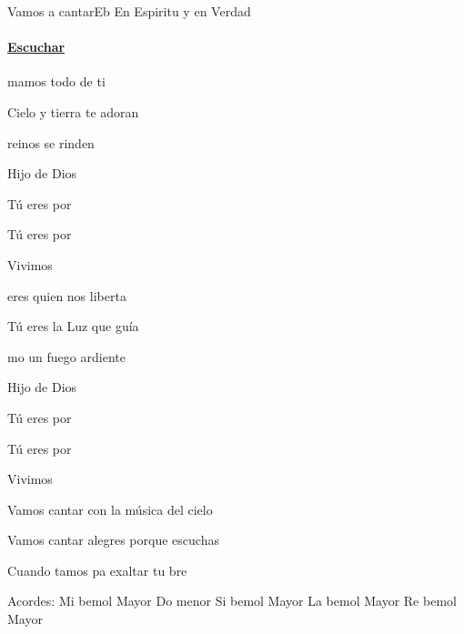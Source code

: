 \documentclass[12pt, spanish]{book}
\newcommand{\NotCCLIed}{\relax}
\begin{document}
    \begin{song}{Vamos a cantar}{Eb}
    {} %
    {En Espiritu y en Verdad}
    {} %
    {} %
        \ifChordBk
        \paragraph{\mbox{}\hfill\protect\href{https://open.spotify.com/intl-es/track/0VuwOyCJLj3T8F8cSyV7Yv}{Escuchar}\mbox{}\hfill}
        \fi

        \begin{SBOpGroup}
            mamos todo de ti

            Cielo y tierra te adoran

             reinos se rinden

            Hijo de Dios

            Tú eres por 

            Tú eres por 

            Vivimos 
        \end{SBOpGroup}

        \begin{SBOpGroup}
             eres quien nos liberta

            Tú eres la Luz que guía

            mo un fuego ardiente

            Hijo de Dios

            Tú eres por 

            Tú eres por 

            Vivimos 
        \end{SBOpGroup}

        \begin{SBChorus}
            Vamos  cantar con la música del cielo

            Vamos  cantar alegres porque escuchas

            Cuando tamos pa exaltar tu bre
        \end{SBChorus}


        \ifChordBk
        \begin{SBOpGroup}
            Acordes:
            \upchord{\Eflat}\qquad Mi bemol Mayor \hfill
            \upchord{\Cm}Do menor \hfill\null\break
            \upchord{\Bflat}\qquad Si bemol Mayor \hfill
            \upchord{\Aflat}\qquad La bemol Mayor \hfill\null\break
            \upchord{\Dflat}\qquad Re bemol Mayor  \hfill
        \end{SBOpGroup}
        \fi
    \end{song}
\end{document}
